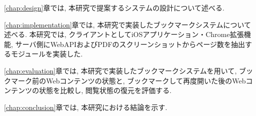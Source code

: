 \ref{chap:design}章では, 本研究で提案するシステムの設計について述べる.

\ref{chap:implementation}章では, 本研究で実装したブックマークシステムについて述べる.
本研究では, クライアントとしてiOSアプリケーション・Chrome拡張機能, サーバ側にWebAPIおよびPDFのスクリーンショットからページ数を抽出するモジュールを実装した.

\ref{chap:evaluation}章では, 本研究で実装したブックマークシステムを用いて, ブックマーク前のWebコンテンツの状態と, ブックマークして再度開いた後のWebコンテンツの状態を比較し, 閲覧状態の復元を評価する.

\ref{chap:conclusion}章では, 本研究における結論を示す.